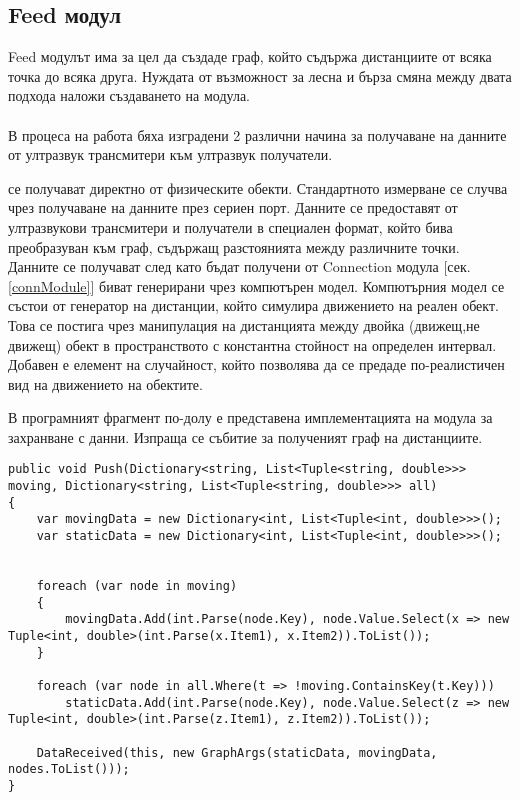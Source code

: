 \subsection{Feed модул}
Feed модулът има за цел да създаде граф, който съдържа дистанциите от всяка точка до всяка друга. Нуждата от възможност за лесна и бърза смяна между двата подхода наложи създаването на модула.\\\\
В процеса на работа бяха изградени 2 различни начина за получаване на данните от ултразвук трансмитери към ултразвук получатели. 
\begin{enumerate}
     се получават директно от физическите обекти. Стандартното измерване се случва чрез получаване на данните през сериен порт. Данните се предоставят от ултразвукови трансмитери и получатели в специален формат, който бива преобразуван към граф, съдържащ разстоянията между различните точки. Данните се получават след като бъдат получени от Connection модула [сек. \ref{connModule}]
     биват генерирани чрез компютърен модел. Компютърния модел се състои от генератор на дистанции, който симулира движението на реален обект. Това се постига чрез манипулация на дистанцията между двойка (движещ,не движещ) обект в пространството с константна стойност на определен интервал. Добавен е елемент на случайност, който позволява да се предаде по-реалистичен вид на движението на обектите.
\end{enumerate}

В програмният фрагмент по-долу е представена имплементацията на модула за захранване с данни. Изпраща се събитие за полученият граф на дистанциите.
\begin{lstlisting}
public void Push(Dictionary<string, List<Tuple<string, double>>> moving, Dictionary<string, List<Tuple<string, double>>> all)
{
    var movingData = new Dictionary<int, List<Tuple<int, double>>>();
    var staticData = new Dictionary<int, List<Tuple<int, double>>>();


    foreach (var node in moving)
    {
        movingData.Add(int.Parse(node.Key), node.Value.Select(x => new Tuple<int, double>(int.Parse(x.Item1), x.Item2)).ToList());
    }

    foreach (var node in all.Where(t => !moving.ContainsKey(t.Key)))
        staticData.Add(int.Parse(node.Key), node.Value.Select(z => new Tuple<int, double>(int.Parse(z.Item1), z.Item2)).ToList());

    DataReceived(this, new GraphArgs(staticData, movingData, nodes.ToList()));
}
\end{lstlisting}

